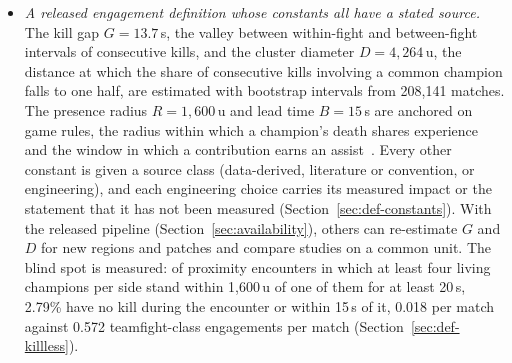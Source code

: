 \begin{itemize}
\item \emph{A released engagement definition whose constants all have a stated source.} The kill
  gap $G = 13.7$\,s, the valley between within-fight and between-fight intervals of consecutive
  kills, and the cluster diameter $D = 4{,}264$\,u, the distance at which the share of consecutive
  kills involving a common champion falls to one half, are estimated with bootstrap intervals from
  208,141 matches. The presence radius $R = 1{,}600$\,u and lead time $B = 15$\,s are anchored on
  game rules, the radius within which a champion's death shares experience~\cite{lolwiki2026experience}
  and the window in which a contribution earns an assist~\cite{lolwiki2026assist}. Every other
  constant is given a source class (data-derived, literature or convention, or engineering), and each
  engineering choice carries its measured impact or the statement that it has not been measured
  (Section~\ref{sec:def-constants}). With the released pipeline (Section~\ref{sec:availability}),
  others can re-estimate $G$ and $D$ for new regions and patches and compare studies on a common
  unit. The blind spot is measured: of proximity encounters in which at least four living champions
  per side stand within 1,600\,u of one of them for at least 20\,s, 2.79\% have no kill during the
  encounter or within 15\,s of it, 0.018 per match against 0.572 teamfight-class engagements per match
  (Section~\ref{sec:def-killless}).

\end{itemize}
